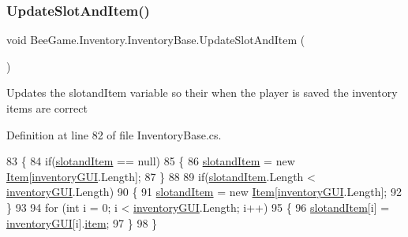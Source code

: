 \subsubsection{\texorpdfstring{Update\+Slot\+And\+Item()}{UpdateSlotAndItem()}}
{\footnotesize\ttfamily void Bee\+Game.\+Inventory.\+Inventory\+Base.\+Update\+Slot\+And\+Item (\begin{DoxyParamCaption}{ }\end{DoxyParamCaption})\hspace{0.3cm}{\ttfamily [protected]}}



Updates the slotand\+Item variable so their when the player is saved the inventory items are correct 



Definition at line 82 of file Inventory\+Base.\+cs.


\begin{DoxyCode}
83         \{
84             \textcolor{keywordflow}{if}(\hyperlink{class_bee_game_1_1_inventory_1_1_inventory_base_a405502a6eabf14e1498d96dc8aff5e8d}{slotandItem} == null)
85             \{
86                 \hyperlink{class_bee_game_1_1_inventory_1_1_inventory_base_a405502a6eabf14e1498d96dc8aff5e8d}{slotandItem} = \textcolor{keyword}{new} \hyperlink{struct_bee_game_1_1_items_1_1_item}{Item}[\hyperlink{class_bee_game_1_1_inventory_1_1_inventory_base_a48dcba7ad7bfa1bed8c9ae290fb32857}{inventoryGUI}.Length];
87             \}
88 
89             \textcolor{keywordflow}{if}(\hyperlink{class_bee_game_1_1_inventory_1_1_inventory_base_a405502a6eabf14e1498d96dc8aff5e8d}{slotandItem}.Length  < \hyperlink{class_bee_game_1_1_inventory_1_1_inventory_base_a48dcba7ad7bfa1bed8c9ae290fb32857}{inventoryGUI}.Length)
90             \{
91                 \hyperlink{class_bee_game_1_1_inventory_1_1_inventory_base_a405502a6eabf14e1498d96dc8aff5e8d}{slotandItem} = \textcolor{keyword}{new} \hyperlink{struct_bee_game_1_1_items_1_1_item}{Item}[\hyperlink{class_bee_game_1_1_inventory_1_1_inventory_base_a48dcba7ad7bfa1bed8c9ae290fb32857}{inventoryGUI}.Length];
92             \}
93 
94             \textcolor{keywordflow}{for} (\textcolor{keywordtype}{int} i = 0; i < \hyperlink{class_bee_game_1_1_inventory_1_1_inventory_base_a48dcba7ad7bfa1bed8c9ae290fb32857}{inventoryGUI}.Length; i++)
95             \{
96                 \hyperlink{class_bee_game_1_1_inventory_1_1_inventory_base_a405502a6eabf14e1498d96dc8aff5e8d}{slotandItem}[i] = \hyperlink{class_bee_game_1_1_inventory_1_1_inventory_base_a48dcba7ad7bfa1bed8c9ae290fb32857}{inventoryGUI}[i].\hyperlink{class_bee_game_1_1_inventory_1_1_inventory_slot_a31b201e7eef9ed0001a447b3f76a7a81}{item};
97             \}
98         \}
\end{DoxyCode}
\mbox{\label{class_bee_game_1_1_inventory_1_1_inventory_base_ac8edbffe8b164d66297c127654c844c4}} 
